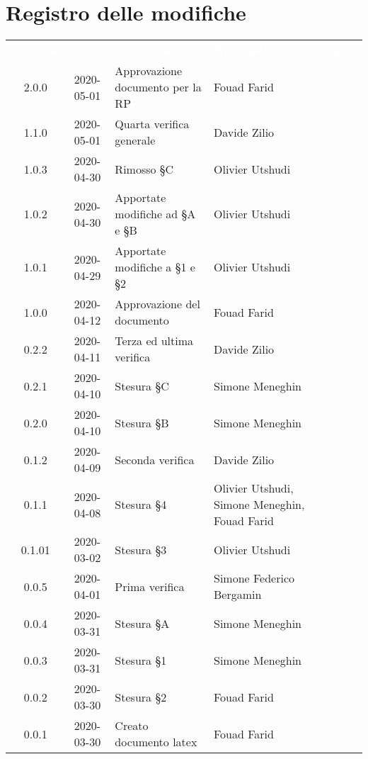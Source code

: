 \section*{Registro delle modifiche}
{
	\centering
	\begin{longtable}{ c c  C{4cm}  C{3.5cm}  C{3.5cm} }
		\textcolor{white}{\textbf{Versione}} & \textcolor{white}{\textbf{Data}} & \textcolor{white}{\textbf{Descrizione}} & \textcolor{white}{\textbf{Nominativo}} & \textcolor{white}{\textbf{Ruolo}}\\	
		2.0.0 & 2020-05-01 & Approvazione documento per la RP & Fouad Farid &\RdP \\
		1.1.0 & 2020-05-01 & Quarta verifica generale & Davide Zilio & \ver{}\\
		1.0.3 & 2020-04-30 & Rimosso §C & Olivier Utshudi &\prog \\		
		1.0.2 & 2020-04-30 & Apportate modifiche ad §A e §B & Olivier Utshudi &\prog \\
		1.0.1 & 2020-04-29 & Apportate modifiche a §1 e §2 & Olivier Utshudi &\prog \\
		1.0.0 & 2020-04-12 & Approvazione del documento & Fouad Farid &\RdP{} \\
		0.2.2 & 2020-04-11 & Terza ed ultima verifica & Davide Zilio &\ver{} \\
		0.2.1 & 2020-04-10 & Stesura \S C & Simone Meneghin &\prog{} \\
		0.2.0 & 2020-04-10 & Stesura \S B & Simone Meneghin &\prog{} \\
		0.1.2 & 2020-04-09 & Seconda verifica & Davide Zilio &\ver{} \\
		0.1.1 & 2020-04-08 & Stesura \S 4 & Olivier Utshudi, Simone Meneghin, Fouad Farid &\prog{} \\
		0.1.01 & 2020-03-02 & Stesura \S 3 & Olivier Utshudi &\prog{} \\
		0.0.5 & 2020-04-01 & Prima verifica & Simone Federico Bergamin &\ver{} \\
		0.0.4 & 2020-03-31 & Stesura \S A & Simone Meneghin &\prog{} \\
		0.0.3 & 2020-03-31 & Stesura \S 1 & Simone Meneghin &\prog{} \\
		0.0.2 & 2020-03-30 & Stesura \S 2 & Fouad Farid &\prog{} \\
		0.0.1 & 2020-03-30 & Creato documento latex & Fouad Farid &\prog{}\\		
		
	\end{longtable}

}